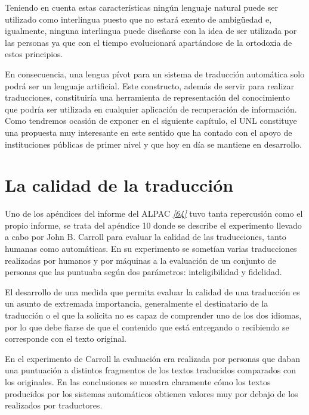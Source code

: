 \documentclass[a4paper,12pt,spanish]{book}
\begin{document}
Teniendo en cuenta estas características ningún lenguaje natural puede ser utilizado
como interlingua puesto que no estará exento de ambigüedad e, igualmente, ninguna
interlingua puede diseñarse con la idea de ser utilizada por las personas ya que
con el tiempo evolucionará apartándose de la ortodoxia de estos principios.

En consecuencia, una lengua pívot para un sistema de traducción automática solo podrá ser
un lenguaje artificial. Este constructo, además de servir para realizar traducciones,
constituiría una herramienta de representación del conocimiento que podría ser utilizada
en cualquier aplicación de recuperación de información. Como tendremos ocasión de
exponer en el siguiente capítulo, el UNL constituye una propuesta muy interesante en este
sentido que ha contado con el apoyo de instituciones públicas de primer nivel y que
hoy en día se mantiene en desarrollo.


\section{La calidad de la traducción}
\label{0.intro:la-calidad-de-la-traduccion}
Uno de los apéndices del informe del ALPAC \label{0.intro:id35}{\hyperref[zreferences:pierce1966]{\emph{{[}64{]}}}} tuvo tanta
repercusión como el propio informe, se trata del apéndice 10 donde se describe
el experimento llevado a cabo por John B. Carroll para evaluar la calidad de las
traducciones, tanto humanas como automáticas. En su experimento se sometían
varias traducciones realizadas por humanos y por máquinas a la evaluación
de un conjunto de personas que las puntuaba según dos parámetros: inteligibilidad
y fidelidad.

El desarrollo de una medida que permita evaluar la calidad de una traducción es
un asunto de extremada importancia, generalmente el destinatario de la traducción o
el que la solicita no es capaz de comprender uno de los dos idiomas, por lo que
debe fiarse de que el contenido que está entregando o recibiendo se corresponde con
el texto original.

En el experimento de Carroll la evaluación era realizada por personas que daban una
puntuación a distintos fragmentos de los textos traducidos comparados con los
originales. En las conclusiones se muestra claramente cómo los textos producidos por
los sistemas automáticos obtienen valores muy por debajo de los realizados por
traductores.
\end{document}
